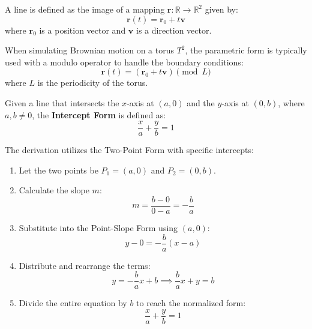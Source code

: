 \begin{definition}
A line is defined as the image of a mapping $\mathbf{r}: \mathbb{R} \to \mathbb{R}^2$ given by:
\[ \mathbf{r}(t) = \mathbf{r}_0 + t\mathbf{v} \]
where $\mathbf{r}_0$ is a position vector and $\mathbf{v}$ is a direction vector.
\end{definition}

\begin{remark}
When simulating Brownian motion on a torus $T^2$, the parametric form is typically used with a modulo operator to handle the boundary conditions:
\[ \mathbf{r}(t) = (\mathbf{r}_0 + t\mathbf{v}) \pmod L \]
where $L$ is the periodicity of the torus.
\end{remark}











\begin{definition}
Given a line that intersects the $x$-axis at $(a, 0)$ and the $y$-axis at $(0, b)$, where $a, b \neq 0$, the \textbf{Intercept Form} is defined as:
\[ \frac{x}{a} + \frac{y}{b} = 1 \]
\end{definition}

\begin{remark}
The derivation utilizes the Two-Point Form with specific intercepts:
\begin{enumerate}
    \item Let the two points be $P_1 = (a, 0)$ and $P_2 = (0, b)$.
    \item Calculate the slope $m$:
    \[ m = \frac{b - 0}{0 - a} = -\frac{b}{a} \]
    \item Substitute into the Point-Slope Form using $(a, 0)$:
    \[ y - 0 = -\frac{b}{a}(x - a) \]
    \item Distribute and rearrange the terms:
    \[ y = -\frac{b}{a}x + b \implies \frac{b}{a}x + y = b \]
    \item Divide the entire equation by $b$ to reach the normalized form:
    \[ \frac{x}{a} + \frac{y}{b} = 1 \]
\end{enumerate}
\end{remark}




